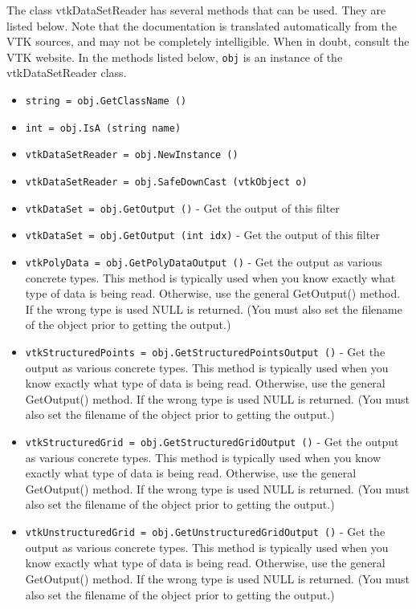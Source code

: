 The class vtkDataSetReader has several methods that can be used.
  They are listed below.
Note that the documentation is translated automatically from the VTK sources,
and may not be completely intelligible.  When in doubt, consult the VTK website.
In the methods listed below, \verb|obj| is an instance of the vtkDataSetReader class.
\begin{itemize}
\item  \verb|string = obj.GetClassName ()|

\item  \verb|int = obj.IsA (string name)|

\item  \verb|vtkDataSetReader = obj.NewInstance ()|

\item  \verb|vtkDataSetReader = obj.SafeDownCast (vtkObject o)|

\item  \verb|vtkDataSet = obj.GetOutput ()| -  Get the output of this filter

\item  \verb|vtkDataSet = obj.GetOutput (int idx)| -  Get the output of this filter

\item  \verb|vtkPolyData = obj.GetPolyDataOutput ()| -  Get the output as various concrete types. This method is typically used
 when you know exactly what type of data is being read.  Otherwise, use
 the general GetOutput() method. If the wrong type is used NULL is
 returned.  (You must also set the filename of the object prior to
 getting the output.)

\item  \verb|vtkStructuredPoints = obj.GetStructuredPointsOutput ()| -  Get the output as various concrete types. This method is typically used
 when you know exactly what type of data is being read.  Otherwise, use
 the general GetOutput() method. If the wrong type is used NULL is
 returned.  (You must also set the filename of the object prior to
 getting the output.)

\item  \verb|vtkStructuredGrid = obj.GetStructuredGridOutput ()| -  Get the output as various concrete types. This method is typically used
 when you know exactly what type of data is being read.  Otherwise, use
 the general GetOutput() method. If the wrong type is used NULL is
 returned.  (You must also set the filename of the object prior to
 getting the output.)

\item  \verb|vtkUnstructuredGrid = obj.GetUnstructuredGridOutput ()| -  Get the output as various concrete types. This method is typically used
 when you know exactly what type of data is being read.  Otherwise, use
 the general GetOutput() method. If the wrong type is used NULL is
 returned.  (You must also set the filename of the object prior to
 getting the output.)


\end{itemize}
